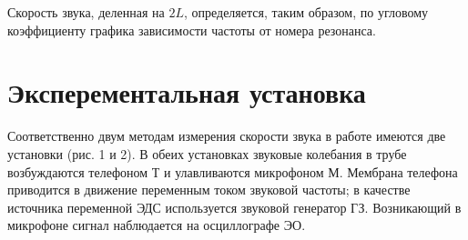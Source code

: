 \documentclass[a4paper, 12pt]{article} %
\begin{document}
        Скорость звука, деленная на $2L$, определяется, таким образом,
        по угловому коэффициенту графика зависимости частоты от номера
        резонанса.

\section{Эксперементальная установка}

\begin{figure}[h]
\end{figure}

    Соответственно двум методам измерения скорости звука в работе имеются две установки (рис. 1 и 2). В обеих установках звуковые колебания в трубе возбуждаются телефоном Т и улавливаются микрофоном М. Мембрана телефона приводится в движение переменным током звуковой частоты; в качестве источника переменной ЭДС используется звуковой генератор ГЗ. Возникающий в микрофоне сигнал наблюдается на осциллографе ЭО.
\end{document}
